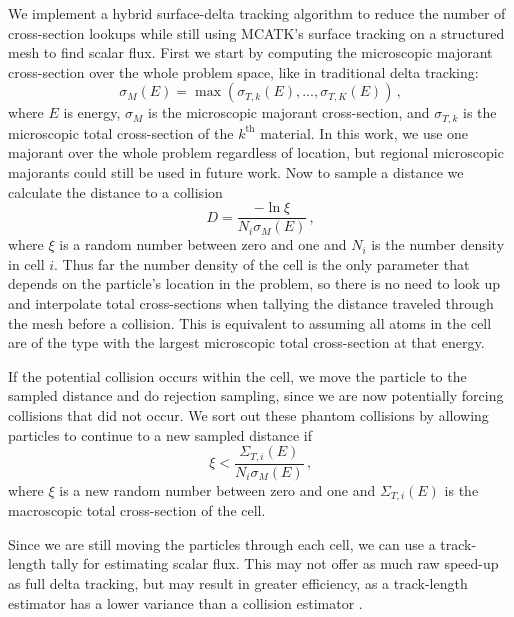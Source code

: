 We implement a hybrid surface-delta tracking algorithm to reduce the number of cross-section lookups while still using MCATK's surface tracking on a structured mesh to find scalar flux. First we start by computing the microscopic majorant cross-section over the whole problem space, like in traditional delta tracking:
\begin{equation}
    \label{eq:majorant_mcatk}
    \sigma_{M}(E) = \max\left(\sigma_{T,k}(E), ..., \sigma_{T,K}(E)\right) \,\text{,}
\end{equation}
where $E$ is energy, $\sigma_{M}$ is the microscopic majorant cross-section, and $\sigma_{T,k}$ is the microscopic total cross-section of the $k^{\text{th}}$ material. In this work, we use one majorant over the whole problem regardless of location, but regional microscopic majorants could still be used in future work. Now to sample a distance we calculate the distance to a collision
\begin{equation}
    \label{eq:sample_mcatk}
    D = \frac{-\ln{\xi}}{N_i \sigma_{M}(E)} \, \text{,} 
\end{equation}
where $\xi$ is a random number between zero and one and $N_i$ is the number density in cell $i$.
Thus far the number density of the cell is the only parameter that depends on the particle's location in the problem, so there is no need to look up and interpolate total cross-sections when tallying the distance traveled through the mesh before a collision.
This is equivalent to assuming all atoms in the cell are of the type with the largest microscopic total cross-section at that energy.

If the potential collision occurs within the cell, we move the particle to the sampled distance and do rejection sampling, since we are now potentially forcing collisions that did not occur. We sort out these phantom collisions by allowing particles to continue to a new sampled distance if
\begin{equation}
    \label{eq:reject_mcatk}
    \xi < \frac{ \Sigma_{T,i}(E) } { N_i \sigma_M(E) } \, \text{,}
\end{equation}
where $\xi$ is a new random number between zero and one and $\Sigma_{T,i}(E)$ is the macroscopic total cross-section of the cell. 

Since we are still moving the particles through each cell, we can use a track-length tally for estimating scalar flux.
This may not offer as much raw speed-up as full delta tracking, but may result in greater efficiency, as a track-length estimator has a lower variance than a collision estimator \cite{mc2018}.

